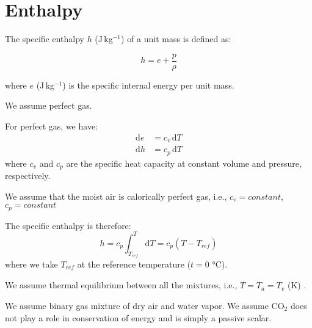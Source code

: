 \section*{Enthalpy}

The specific enthalpy $h$ (J\,kg$^{-1}$) of a unit mass is defined as:

\begin{equation}
h = e + \frac{p}{\rho}
\end{equation}

where $e$ (J\,kg$^{-1}$) is the specific internal energy per unit mass. 

\begin{assumption}
	We assume perfect gas.
\end{assumption}

For perfect gas, we have:
\begin{align}
\mathrm{d}e &= c_v \,\mathrm{d}T\\
\mathrm{d}h &= c_p \,\mathrm{d}T
\end{align}
where $c_v$ and $c_p$ are the specific heat capacity at constant volume and pressure, respectively.
\begin{assumption}
	We assume that the moist air is calorically perfect gas, i.e., $c_v=\textit{constant}$, $c_p=\textit{constant}$
\end{assumption}
The specific enthalpy is therefore:
\begin{equation}
h = c_p \int^T_{T_{\textit{ref}}} \mathrm{d}T = c_p \left(T - T_{\textit{ref}}\right)
\end{equation}
where we take $T_{\textit{ref}}$ at the reference temperature ($t=0$ \si{\degreeCelsius}).

\begin{assumption}
	We assume thermal equilibrium between all the mixtures, i.e., $T = T_a = T_v$ (K) \citep{Defraeye2011}.
\end{assumption}

\begin{assumption}
	We assume binary gas mixture of dry air and water vapor. We assume CO$_2$ does not play a role in conservation of energy and is simply a passive scalar.
\end{assumption}

